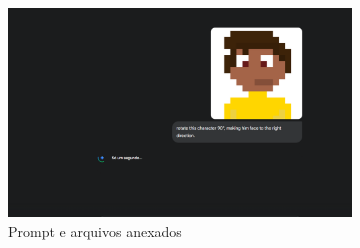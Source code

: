 \begin{figure}[htbp]
    \centering
    \caption{\small Processo da geração 4 do sprite em side view no Gemini Pro em julho/2025}
    \label{fig:geminiPro4}

    \begin{subfigure}{0.8\linewidth}
        \includegraphics[width=1\linewidth]{figs/geminiPro/chat2/tela1.PNG}
        \caption{\small Prompt e arquivos anexados}
        \label{fig:geminiPro4Prompt}
    \end{subfigure}
    \begin{subfigure}{0.3\linewidth}

\end{subfigure}
\end{figure}
